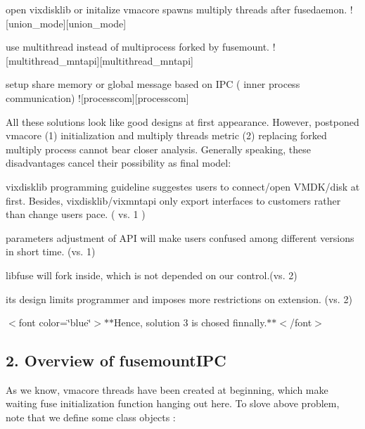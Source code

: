 \begin{DoxyEnumerate}
\item open vixdisklib or initalize vmacore spawns multiply threads after fusedaemon. !\mbox{[}union\+\_\+mode\mbox{]}\mbox{[}union\+\_\+mode\mbox{]}
\end{DoxyEnumerate}
\begin{DoxyItemize}
\item use multithread instead of multiprocess forked by fusemount. !\mbox{[}multithread\+\_\+mntapi\mbox{]}\mbox{[}multithread\+\_\+mntapi\mbox{]}
\item setup share memory or global message based on I\+PC ( inner process communication) !\mbox{[}processcom\mbox{]}\mbox{[}processcom\mbox{]}
\end{DoxyItemize}

All these solutions look like good designs at first appearance. However, postponed vmacore (1) initialization and multiply threads metric (2) replacing forked multiply process cannot bear closer analysis. Generally speaking, these disadvantages cancel their possibility as final model\+:


\begin{DoxyItemize}
\item vixdisklib programming guideline suggestes users to connect/open V\+M\+D\+K/disk at first. Besides, vixdisklib/vixmntapi only export interfaces to customers rather than change users\textquotesingle{} pace. ( vs. 1 )
\item parameters adjustment of A\+PI will make users confused among different versions in short time. (vs. 1)
\item libfuse will fork inside, which is not depended on our control.(vs. 2)
\item its design limits programmer and imposes more restrictions on extension. (vs. 2)
\end{DoxyItemize}

$<$font color=\char`\"{}blue\char`\"{}$>$$\ast$$\ast$\+Hence, solution 3 is chosed finnally.$\ast$$\ast$$<$/font$>$ 

 \subsection*{2. Overview of fusemount\+I\+PC}

As we know, vmacore threads have been created at beginning, which make waiting fuse initialization function hanging out here. To slove above problem, note that we define some class objects \+:


